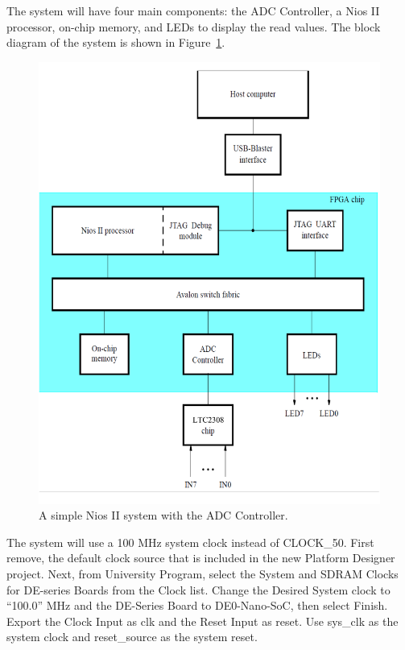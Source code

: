 \documentclass[11pt, twoside, pdftex]{article}
\begin{document}
The system will have four main components: the ADC Controller, a Nios II processor, on-chip memory, and LEDs to display the read values. The block diagram of the system is shown in Figure~\ref{fig:sys_diagram}.
\begin {figure} [H]
\begin {center}
\includegraphics [scale = 0.60]{figures/system_diagram.pdf}
\end {center}
\caption{A simple Nios II system with the ADC Controller.}
\label{fig:sys_diagram}
\end {figure}

The system will use a 100 MHz system clock instead of CLOCK\_50. First remove, the default clock source that is included in the new Platform Designer project. Next, from {\sf University Program}, select the {\sf System and SDRAM Clocks for DE-series Boards} from the {\sf Clock} list. Change the Desired System clock to ``100.0'' MHz and the DE-Series Board to {\sf DE0-Nano-SoC}, then select {\sf Finish}. Export the Clock Input as {\sf clk} and the Reset Input as {\sf reset}. Use {\sf sys\_clk} as the system clock and {\sf reset\_source} as the system reset.
\end{document}
